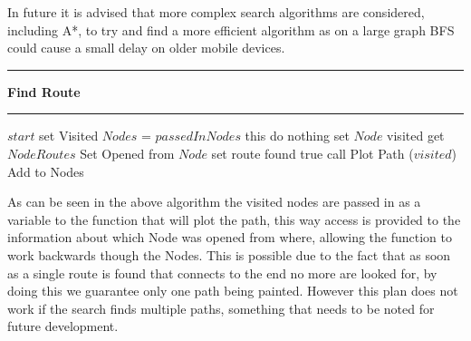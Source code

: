 In future it is advised that more complex search algorithms are considered, including A*\cite{astar}, to try and find a more efficient algorithm as on a large graph BFS could cause a small delay on older mobile devices. 
\vspace{0.3cm}
\hrule
\vspace{0.1cm}
\textbf{Find Route}
\vspace{0.1cm}
\hrule
\vspace{0.1cm}
\begin{algorithmic}[1]
\State $start$ set Visited
\State $Nodes$ = $passedInNodes$
 this
    \State do nothing
\Else
	\State set $Node$ visited
    \State get $Node Routes$
    \State Set Opened from $Node$
    		\State set route found true
    		\State call Plot Path ($visited$)
    	\EndIf
    		\State Add to Nodes
    	\EndIf
    \EndFor
\EndIf
\EndFor
\EndWhile
\end{algorithmic}

As can be seen in the above algorithm the visited nodes are passed in as a variable to the function that will plot the path, this way access is provided to the information about which Node was opened from where, allowing the function to work backwards though the Nodes. This is possible due to the fact that as soon as a single route is found that connects to the end no more are looked for, by doing this we guarantee only one path being painted. However this plan does not work if the search finds multiple paths, something that needs to be noted for future development. 

